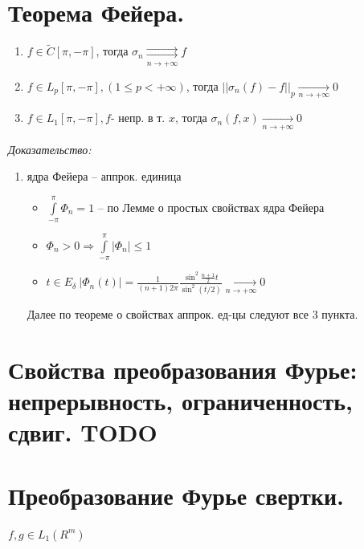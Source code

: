 \documentclass[paper=a4, fontsize=17pt]{article}
\begin{document}
\section{Теорема Фейера.}

	\begin{enumerate}
		\item $ f \in \widetilde{C}[\pi, -\pi] $, тогда $ \sigma_n \underset{n \rightarrow +\infty}{\rightrightarrows} f$

		\item $ f \in L_p[\pi, -\pi], (1 \leq p < +\infty)$, тогда $ ||\sigma_n(f) - f||_p \underset{n \rightarrow +\infty}{\rightarrow} 0 $

		\item $ f \in L_1[\pi, -\pi], f $- непр. в т. $x$, тогда $ \sigma_n(f, x) \underset{n \rightarrow +\infty}{\rightarrow} 0 $
	\end{enumerate}

	\emph{Доказательство:}

	\begin{enumerate}
		\item ядра Фейера -- аппрок. единица
		\begin{itemize}
			\item $ \int\limits_{-\pi}^{\pi} \Phi_n  = 1 $ -- по Лемме о простых свойствах ядра Фейера
			\item $  \Phi_n > 0 \Rightarrow \int\limits_{-\pi}^{\pi} |\Phi_n | \leq 1$
			\item $ t \in E_{\delta} ~ | \Phi_n(t)| = \frac{1}{(n+1)2\pi}\frac{\sin^2\frac{n + 1}{2}t}{\sin^2(t/2)} \underset{n \rightarrow +\infty}{\rightarrow} 0 $
		\end{itemize}

		Далее по теореме о свойствах аппрок. ед-цы следуют все 3 пункта.

	\end{enumerate}

\section{Свойства преобразования Фурье: непрерывность, ограниченность, сдвиг. TODO}

\section{Преобразование Фурье свертки.}
	$ f, g \in L_1(R^m) $
\end{document}
